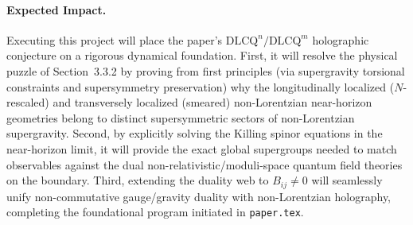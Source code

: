 \documentclass[11pt,a4paper]{article}
\begin{document}
\paragraph{Expected Impact.}
Executing this project will place the paper's $\text{DLCQ}^n/\text{DLCQ}^m$ holographic conjecture on a rigorous dynamical foundation. First, it will resolve the physical puzzle of Section~3.3.2 by proving from first principles (via supergravity torsional constraints and supersymmetry preservation) why the longitudinally localized ($N$-rescaled) and transversely localized (smeared) non-Lorentzian near-horizon geometries belong to distinct supersymmetric sectors of non-Lorentzian supergravity. Second, by explicitly solving the Killing spinor equations in the near-horizon limit, it will provide the exact global supergroups needed to match observables against the dual non-relativistic/moduli-space quantum field theories on the boundary. Third, extending the duality web to $B_{ij} \neq 0$ will seamlessly unify non-commutative gauge/gravity duality with non-Lorentzian holography, completing the foundational program initiated in \texttt{paper.tex}.
\end{document}
